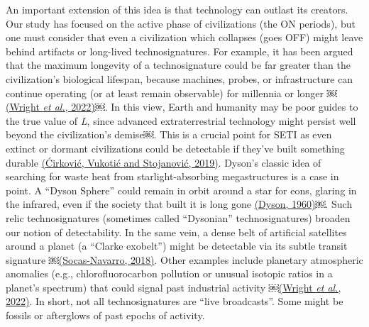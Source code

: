 An important extension of this idea is that technology can outlast its creators. Our study has focused on the active phase of civilizations (the ON periods), but one must consider that even a civilization which collapses (goes OFF) might leave behind artifacts or long-lived technosignatures. For example, it has been argued that the maximum longevity of a technosignature could be far greater than the civilization's biological lifespan, because machines, probes, or infrastructure can continue operating (or at least remain observable) for millennia or longer ￼\href{https://paperpile.com/c/hQuIW4/r66q}{(Wright \emph{et al.}, 2022)}￼. In this view, Earth and humanity may be poor guides to the true value of \emph{L}, since advanced extraterrestrial technology might persist well beyond the civilization's demise￼. This is a crucial point for SETI as even extinct or dormant civilizations could be detectable if they've built something durable \href{https://paperpile.com/c/hQuIW4/4VUA}{(Ćirković, Vukotić and Stojanović, 2019)}. Dyson's classic idea of searching for waste heat from starlight-absorbing megastructures is a case in point. A ``Dyson Sphere'' could remain in orbit around a star for eons, glaring in the infrared, even if the society that built it is long gone \href{https://paperpile.com/c/hQuIW4/l4IB}{(Dyson, 1960)}￼. Such relic technosignatures (sometimes called ``Dysonian'' technosignatures) broaden our notion of detectability. In the same vein, a dense belt of artificial satellites around a planet (a ``Clarke exobelt'') might be detectable via its subtle transit signature ￼\href{https://paperpile.com/c/hQuIW4/EjlN}{(Socas-Navarro, 2018)}. Other examples include planetary atmospheric anomalies (e.g., chlorofluorocarbon pollution or unusual isotopic ratios in a planet's spectrum) that could signal past industrial activity ￼\href{https://paperpile.com/c/hQuIW4/r66q}{(Wright \emph{et al.}, 2022)}. In short, not all technosignatures are ``live broadcasts''. Some might be fossils or afterglows of past epochs of activity.

